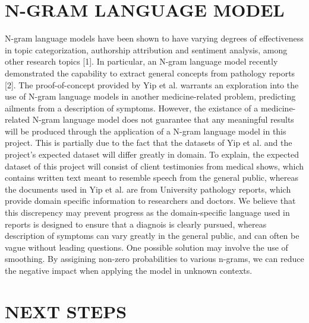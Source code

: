 \documentclass[12pt, final, onecolumn, comsoc, conference]{IEEEtran}
\begin{document}
\section{\MakeTextUppercase{N-Gram Language Model}}
N-gram language models have been shown to have varying degrees of effectiveness in topic categorization,
authorship attribution and sentiment analysis, among other research topics [1]. In particular, an N-gram language
model recently demonstrated the capability to extract general concepts from pathology reports [2].
The proof-of-concept provided by Yip et al. warrants an exploration into the use of N-gram language models
in another medicine-related problem, predicting ailments from a description of symptoms.
However, the existance of a medicine-related N-gram language model does not guarantee that any
meaningful results will be produced through the application of a N-gram language model in this project.
This is partially due to the fact that the datasets of Yip et al. and the project's expected dataset will differ
greatly in domain.
To explain, the expected dataset of this project will consist of client testimonies from medical shows,
which contains written text meant to resemble speech from the general public,
whereas the documents used in Yip et al. are from University pathology reports,
which provide domain specific information to researchers and doctors.
We believe that this discrepency may prevent progress as the domain-specific language used in reports
is designed to ensure that a diagnois is clearly pursued, whereas description of symptoms can vary greatly
in the general public, and can often be vague without leading questions.
One possible solution may involve the use of smoothing. By assigining non-zero
probabilities to various n-grams, we can reduce the negative impact when applying the model in unknown contexts.

\section{\MakeUppercase{Next Steps}}
\end{document}
